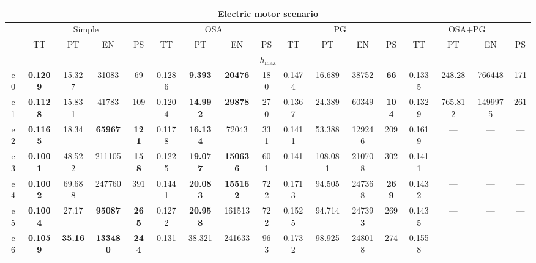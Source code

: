 \begin{tabular}{||c||c|c|c|c||c|c|c|c||c|c|c|c||c|c|c|c||}%
\multicolumn{17}{c}{\textbf{Electric motor scenario}}\\%
\hline%
&\multicolumn{4}{|c|}{\small{Simple}}&\multicolumn{4}{|c|}{\small{OSA}}&\multicolumn{4}{|c|}{\small{PG}}&\multicolumn{4}{|c|}{\small{OSA+PG}}\\%
\hline%
&\small{TT}&\small{PT}&\small{EN}&\small{PS}&\small{TT}&\small{PT}&\small{EN}&\small{PS}&\small{TT}&\small{PT}&\small{EN}&\small{PS}&\small{TT}&\small{PT}&\small{EN}&\small{PS}\\%
\hline%
\multicolumn{17}{||c||}{$h_{\max}$}\\%
\hline%
e0&\small{\textbf{0.1209}}&\small{15.327}&\small{31083}&\small{69}&\small{0.1286}&\small{\textbf{9.393}}&\small{\textbf{20476}}&\small{180}&\small{0.1474}&\small{16.689}&\small{38752}&\small{\textbf{66}}&\small{0.1335}&\small{248.28}&\small{766448}&\small{171}\\%
\hline%
e1&\small{\textbf{0.1128}}&\small{15.831}&\small{41783}&\small{109}&\small{0.1204}&\small{\textbf{14.992}}&\small{\textbf{29878}}&\small{270}&\small{0.1367}&\small{24.389}&\small{60349}&\small{\textbf{104}}&\small{0.1329}&\small{765.812}&\small{1499975}&\small{261}\\%
\hline%
e2&\small{\textbf{0.1165}}&\small{18.34}&\small{\textbf{65967}}&\small{\textbf{121}}&\small{0.1178}&\small{\textbf{16.134}}&\small{72043}&\small{331}&\small{0.1411}&\small{53.388}&\small{129246}&\small{209}&\small{0.1619}&\small{---}&\small{---}&\small{---}\\%
\hline%
e3&\small{\textbf{0.1001}}&\small{48.522}&\small{211105}&\small{\textbf{158}}&\small{0.1225}&\small{\textbf{19.077}}&\small{\textbf{150636}}&\small{601}&\small{0.141}&\small{108.081}&\small{210708}&\small{302}&\small{0.1411}&\small{---}&\small{---}&\small{---}\\%
\hline%
e4&\small{\textbf{0.1002}}&\small{69.688}&\small{247760}&\small{391}&\small{0.1441}&\small{\textbf{20.083}}&\small{\textbf{155162}}&\small{722}&\small{0.1713}&\small{94.505}&\small{247368}&\small{\textbf{269}}&\small{0.1432}&\small{---}&\small{---}&\small{---}\\%
\hline%
e5&\small{\textbf{0.1004}}&\small{27.17}&\small{\textbf{95087}}&\small{\textbf{265}}&\small{0.1272}&\small{\textbf{20.958}}&\small{161513}&\small{722}&\small{0.1525}&\small{94.714}&\small{247393}&\small{269}&\small{0.1435}&\small{---}&\small{---}&\small{---}\\%
\hline%
e6&\small{\textbf{0.1059}}&\small{\textbf{35.16}}&\small{\textbf{133480}}&\small{\textbf{244}}&\small{0.131}&\small{38.321}&\small{241633}&\small{963}&\small{0.1732}&\small{98.925}&\small{248018}&\small{274}&\small{0.1558}&\small{---}&\small{---}&\small{---}\\%

\end{tabular}
